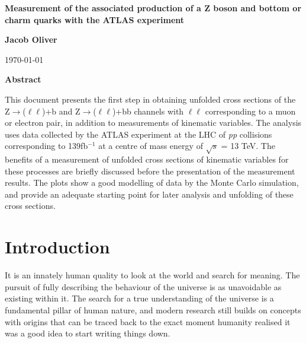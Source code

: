 \documentclass[12pt,a4paper,epsf,portrait,times,epsfig]{report}
\begin{document}
	\begin{center}
		{\Large \bf Measurement of the associated production of a Z boson and bottom or charm quarks with the ATLAS experiment}
	\end{center}
		
		\vspace{3.0cm}
		
	\begin{center}
		{\Large \bf Jacob Oliver}
	\end{center}

		\vspace{1.5cm}
		
	\begin{center}
		\today
	\end{center}
		
		\vspace{3.0cm}
		
		
	\begin{center}
		{\large \bf Abstract}
	\end{center}
	This document presents the first step in obtaining unfolded cross sections of the Z$\rightarrow$($\ell\ell$)+b and Z$\rightarrow$($\ell\ell$)+bb channels with $\ell\ell$ corresponding to a muon or electron pair, in addition to measurements of kinematic variables. The analysis uses data collected by the ATLAS experiment at the LHC of \textit{pp} collisions corresponding to 139fb$^{-1}$ at a centre of mass energy of $\sqrt{s}$ = 13 TeV. The benefits of a measurement of unfolded cross sections of kinematic variables for these processes are briefly discussed before the presentation of the measurement results. The plots show a good modelling of data by the Monte Carlo simulation, and provide an adequate starting point for later analysis and unfolding of these cross sections.   
	
	\newpage
	\tableofcontents
	\newpage
	
	\chapter{Introduction}
	
	It is an innately human quality to look at the world and search for meaning. The pursuit of fully describing the behaviour of the universe is as unavoidable as existing within it. The search for a true understanding of the universe is a fundamental pillar of human nature, and modern research still builds on concepts with origins that can be traced back to the exact moment humanity realised it was a good idea to start writing things down. \par
	
\end{document}
